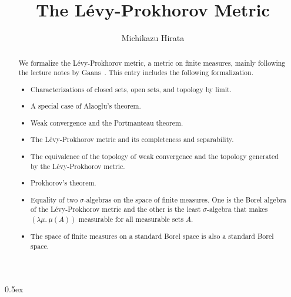 \documentclass[11pt,a4paper]{article}
\begin{document}
\title{The L\'evy-Prokhorov Metric}
\author{Michikazu Hirata}
\maketitle
\begin{abstract}
  We formalize the L\'evy-Prokhorov metric, a metric on finite measures,
  mainly following the lecture notes by Gaans~\cite{Onno}.
  This entry includes the following formalization.
  \begin{itemize}
  \item Characterizations of closed sets, open sets, and topology by limit.
  \item A special case of Alaoglu's theorem.
  \item Weak convergence and the Portmanteau theorem.
  \item The L\'evy-Prokhorov metric and its completeness and separability.
  \item The equivalence of the topology of weak convergence and
  the topology generated by the L\'evy-Prokhorov metric.
  \item Prokhorov's theorem.
  \item Equality of two $\sigma$-algebras on the space of finite measures.
  One is the Borel algebra of the L\'evy-Prokhorov metric and the other is the least $\sigma$-algebra
  that makes $(\lambda\mu.\: \mu(A))$ measurable for all measurable sets $A$.
  \item The space of finite measures on a standard Borel space is also a standard Borel space.
  \end{itemize}
\end{abstract}

\tableofcontents

\parindent 0pt\parskip 0.5ex





\end{document}
